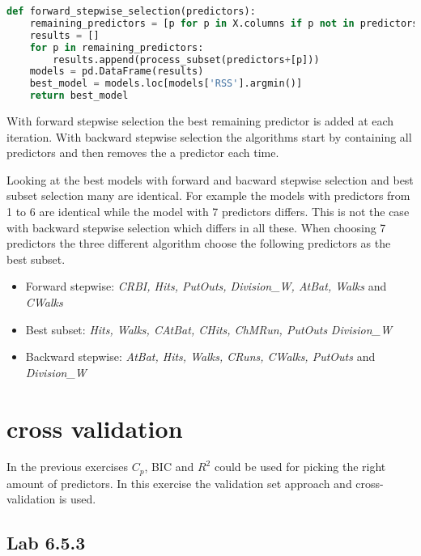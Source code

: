 \begin{lstlisting}[language=Python, label=lst:forwardselection, caption=metricsUtil for calculating Cp\, BIC and RSS]
def forward_stepwise_selection(predictors):
	remaining_predictors = [p for p in X.columns if p not in predictors]
	results = []
	for p in remaining_predictors:
		results.append(process_subset(predictors+[p]))
	models = pd.DataFrame(results)
	best_model = models.loc[models['RSS'].argmin()]
	return best_model
\end{lstlisting}

With forward stepwise selection the best remaining predictor is added at each iteration. With backward stepwise selection the algorithms start by containing all predictors and then removes the a predictor each time. 

Looking at the best models with forward and bacward stepwise selection and best subset selection many are identical. For example the models with predictors from 1 to 6 are identical while the model with 7 predictors differs. This is not the case with backward stepwise selection which differs in all these. When choosing 7 predictors the three different algorithm choose the following predictors as the best subset.

\begin{itemize}
\item Forward stepwise: \emph{CRBI, Hits, PutOuts, Division\_W, AtBat, Walks} and \emph{CWalks}
\item Best subset: \emph{Hits, Walks, CAtBat, CHits, ChMRun, PutOuts} \emph{Division\_W}
\item Backward stepwise: \emph{AtBat, Hits, Walks, CRuns, CWalks, PutOuts} and \emph{Division\_W}
\end{itemize}

\section{cross validation}
In the previous exercises $C_p$, BIC and $R^2$ could be used for picking the right amount of predictors. In this exercise the validation set approach and cross-validation is used.
\subsection{Lab 6.5.3}